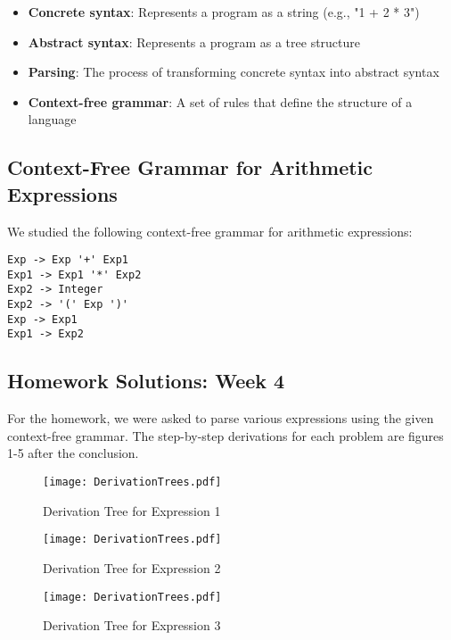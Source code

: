 \documentclass{article}
\begin{document}
\begin{itemize}
    \item \textbf{Concrete syntax}: Represents a program as a string (e.g., "1 + 2 * 3")
    \item \textbf{Abstract syntax}: Represents a program as a tree structure
    \item \textbf{Parsing}: The process of transforming concrete syntax into abstract syntax
    \item \textbf{Context-free grammar}: A set of rules that define the structure of a language
\end{itemize}

\subsection*{Context-Free Grammar for Arithmetic Expressions}

We studied the following context-free grammar for arithmetic expressions:

\begin{verbatim}
Exp -> Exp '+' Exp1 
Exp1 -> Exp1 '*' Exp2              
Exp2 -> Integer            
Exp2 -> '(' Exp ')'  
Exp -> Exp1             
Exp1 -> Exp2
\end{verbatim}

\subsection*{Homework Solutions: Week 4}

For the homework, we were asked to parse various expressions using the given context-free grammar. The step-by-step derivations for each problem are figures 1-5 after the conclusion.

\begin{figure}[h]
\centering
\texttt{[image: DerivationTrees.pdf]}
\caption{Derivation Tree for Expression 1}
\end{figure}

\begin{figure}[h]
\centering
\texttt{[image: DerivationTrees.pdf]}
\caption{Derivation Tree for Expression 2}
\end{figure}

\begin{figure}[h]
\centering
\texttt{[image: DerivationTrees.pdf]}
\caption{Derivation Tree for Expression 3}
\end{figure}
\end{document}
